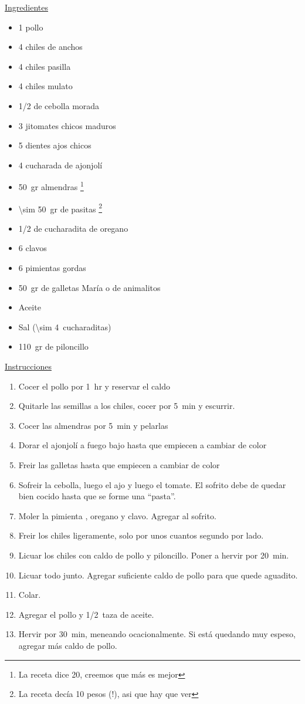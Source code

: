 \underline{Ingredientes}
\begin{itemize}
\item 1 pollo
\item 4 chiles de anchos
\item 4 chiles pasilla
\item 4 chiles mulato
\item \num{1/2} de cebolla morada
\item 3 jitomates chicos maduros
\item 5 dientes ajos chicos
\item 4 cucharada de ajonjolí
\item \SI{50}{gr} almendras \footnote{La receta dice 20, creemos que más es mejor}
\item \SI{\sim 50}{gr} de pasitas \footnote{La receta decía 10 pesos (!), asi que hay que ver}
\item \num{1/2} de cucharadita de oregano
\item 6 clavos
\item 6 pimientas gordas
\item \SI{50}{gr} de galletas María o de animalitos
\item Aceite
\item Sal (\SI{\sim 4}{cucharaditas})
\item \SI{110}{gr} de piloncillo
\end{itemize}

\underline{Instrucciones}
\begin{enumerate}
\item Cocer el pollo por \SI{1}{hr} y reservar el caldo
\item Quitarle las semillas a los chiles, cocer por \SI{5}{min} y escurrir.
\item Cocer las almendras por \SI{5}{min} y pelarlas
\item Dorar el ajonjolí a fuego bajo hasta que empiecen a cambiar de color
\item Freir las galletas hasta que empiecen a cambiar de color
\item Sofreir la cebolla, luego el ajo y luego el tomate. El sofrito debe de quedar bien cocido hasta que se forme una ``pasta''.
\item Moler la pimienta , oregano y clavo. Agregar al sofrito.
\item Freir los chiles ligeramente, solo por unos cuantos segundo por lado.
\item Licuar los chiles con caldo de pollo y piloncillo. Poner a hervir por \SI{20}{min}. 
\item Licuar todo junto. Agregar suficiente caldo de pollo para que quede aguadito.
\item Colar.
\item Agregar el pollo y \SI{1/2}{taza} de aceite.
\item Hervir por \SI{30}{min}, meneando ocacionalmente. Si está quedando muy espeso, agregar más caldo de pollo.
\end{enumerate}